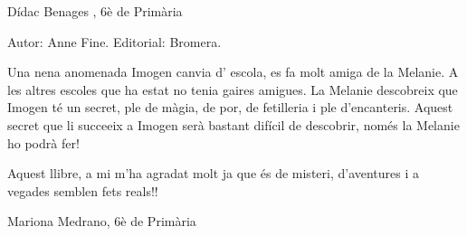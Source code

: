 \begin{shortnews}
{Dídac Benages , 6è de Primària
}

{
Autor: Anne Fine. Editorial: Bromera.

Una nena anomenada Imogen canvia d’ escola, es fa  molt amiga de la Melanie. A les altres escoles que ha estat no tenia gaires amigues. La Melanie descobreix que Imogen té un secret, ple de màgia, de por, de fetilleria i ple d’encanteris. Aquest secret que li succeeix a Imogen serà bastant difícil de descobrir, només la Melanie ho podrà fer!

Aquest llibre, a mi m’ha agradat molt ja que és de misteri, d’aventures i a vegades semblen fets reals!!

Mariona Medrano, 6è de Primària
}

\end{shortnews}
